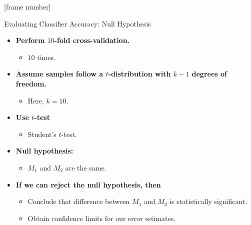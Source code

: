 \documentclass[aspectratio=169,t,table]{beamer}
\begin{document}
  {
    [frame number]
    \begin{frame}{Evaluating Classifier Accuracy: Null Hypothesis}
      \begin{itemize}
        \item \textbf{Perform $10$-fold cross-validation.}
        \begin{itemize}
          \item $10$ times.
        \end{itemize}
        \item \textbf{Assume samples follow a $t$-distribution with $k-1$ degrees of freedom.}
        \begin{itemize}
          \item Here, $k = 10$.
        \end{itemize}
        \item \textbf{Use $t$-test}
        \begin{itemize}
          \item Student's $t$-test.
        \end{itemize}
        \item \textbf{Null hypothesis:}
        \begin{itemize}
          \item $M_1$ and $M_2$ are the same.
        \end{itemize}
        \item \textbf{If we can reject the null hypothesis, then}
        \begin{itemize}
          \item Conclude that difference between $M_1$ and $M_2$ is statistically significant.
          \item Obtain confidence limits for our error estimates.
        \end{itemize}
      \end{itemize}
    \end{frame}
  }
\end{document}
